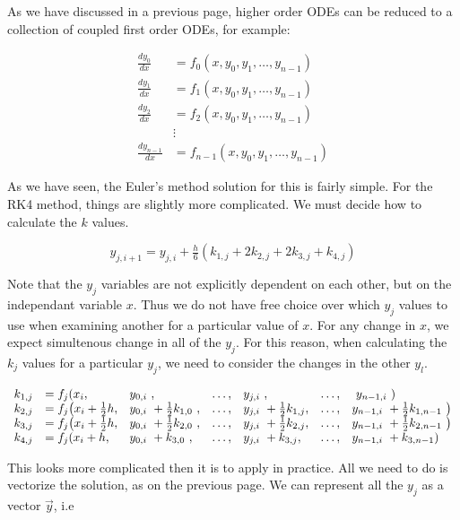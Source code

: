 \documentclass[11pt]{article}
\begin{document}
    As we have discussed in a previous page, higher order ODEs can be
reduced to a collection of coupled first order ODEs, for example:

\begin{align}
\frac{d y_0}{dx} &= f_0(x, y_0, y_1, \dots, y_{n-1})\\
\frac{d y_1}{dx} &= f_1(x, y_0, y_1, \dots, y_{n-1})\\
\frac{d y_2}{dx} &= f_2(x, y_0, y_1, \dots, y_{n-1})\\
                 &\vdots \\
\frac{d y_{n-1}}{dx} &= f_{n-1}(x, y_0, y_1, \dots, y_{n-1})
\end{align}

As we have seen, the Euler's method solution for this is fairly simple.
For the RK4 method, things are slightly more complicated. We must decide
how to calculate the \(k\) values.





    \[
y_{j, i+1} = y_{j, i} + \tfrac{h}{6} (k_{1, j} + 2 k_{2, j} + 2 k_{3, j} + k_{4, j} )
\]

Note that the \(y_j\) variables are not explicitly dependent on each
other, but on the independant variable \(x\). Thus we do not have free
choice over which \(y_j\) values to use when examining another for a
particular value of \(x\). For any change in \(x\), we expect
simultenous change in all of the \(y_j\). For this reason, when
calculating the \(k_j\) values for a particular \(y_j\), we need to
consider the changes in the other \(y_l\).

\[
\begin{array}{l l l l l l l}
k_{1, j} &= f_j (x_i, &y_{0, i}~, &\dots, &y_{j, i}~, &\dots, &~y_{n-1, i}~)\\
k_{2, j} &= f_j \big(x_i + \tfrac{1}{2}h, &y_{0, i}~ + \tfrac{1}{2} k_{1, 0}~, &\dots, &y_{j, i}~ + \tfrac{1}{2} k_{1, j}, &\dots, &y_{n-1, i}~ + \tfrac{1}{2} k_{1, n-1}~ \big)\\
k_{3, j} &= f_j \big(x_i + \tfrac{1}{2}h, &y_{0, i}~ + \tfrac{1}{2} k_{2, 0}~, &\dots, &y_{j, i}~ + \tfrac{1}{2} k_{2, j}, &\dots, &y_{n-1, i}~ + \tfrac{1}{2} k_{2, n-1}~\big)\\
k_{4, j} &= f_j ( x_i + h, &y_{0, i}~ + k_{3, 0}~, &\dots, &y_{j, i}~ + k_{3, j}, &\dots, &y_{n-1, i}~ + k_{3, n-1} )\\
\end{array}
\]

This looks more complicated then it is to apply in practice. All we need
to do is vectorize the solution, as on the previous page. We can
represent all the \(y_j\) as a vector \(\vec{y}\), i.e
\end{document}
